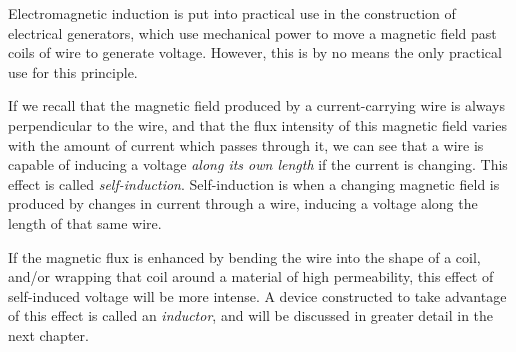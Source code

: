 

Electromagnetic induction is put into practical use in the
construction of electrical generators, which use mechanical power
to move a magnetic field past coils of wire to generate voltage.
However, this is by no means the only practical use for this
principle.
 
If we recall that the magnetic field produced by a
current-carrying wire is always perpendicular to the wire, and
that the flux intensity of this magnetic field varies with the
amount of current which passes through it, we can see that a wire is capable of
inducing a voltage \textit{along its own length} if the current is changing. This effect is called
\textit{self-induction}. Self-induction is when a changing magnetic field is produced by
changes in current through a wire, inducing a voltage along the
length of that same wire.
  
If the magnetic flux is enhanced
by bending the wire into the shape of a coil, and/or wrapping that
coil around a material of high permeability, this effect of
self-induced voltage will be more intense. A device constructed to
take advantage of this effect is called an \textit{inductor}, and
will be discussed in greater detail in the next chapter.


